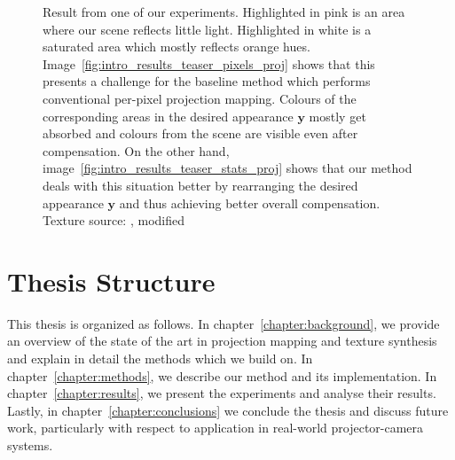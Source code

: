 \begin{figure}[ht]
    \caption{Result from one of our experiments. Highlighted in pink is an area where our scene reflects little light. Highlighted in white is a saturated area which mostly reflects orange hues. Image~\ref{fig:intro_results_teaser_pixels_proj} shows that this presents a challenge for the baseline method which performs conventional per-pixel projection mapping. Colours of the corresponding areas in the desired appearance \(\bm{y}\) mostly get absorbed and colours from the scene are visible even after compensation. On the other hand, image~\ref{fig:intro_results_teaser_stats_proj} shows that our method deals with this situation better by rearranging the desired appearance \(\bm{y}\) and thus achieving better overall compensation. Texture source: \citet{Pixar128}, modified}
    \label{fig:intro_result_teaser}
\end{figure}

\section{Thesis Structure}
\label{section:intro-thesis_structure}

This thesis is organized as follows. In chapter~\ref{chapter:background}, we provide an overview of the state of the art in projection mapping and texture synthesis and explain in detail the methods which we build on. In chapter~\ref{chapter:methods}, we describe our method and its implementation. In chapter~\ref{chapter:results}, we present the experiments and analyse their results. Lastly, in chapter~\ref{chapter:conclusions} we conclude the thesis and discuss future work, particularly with respect to application in real-world projector-camera systems.
